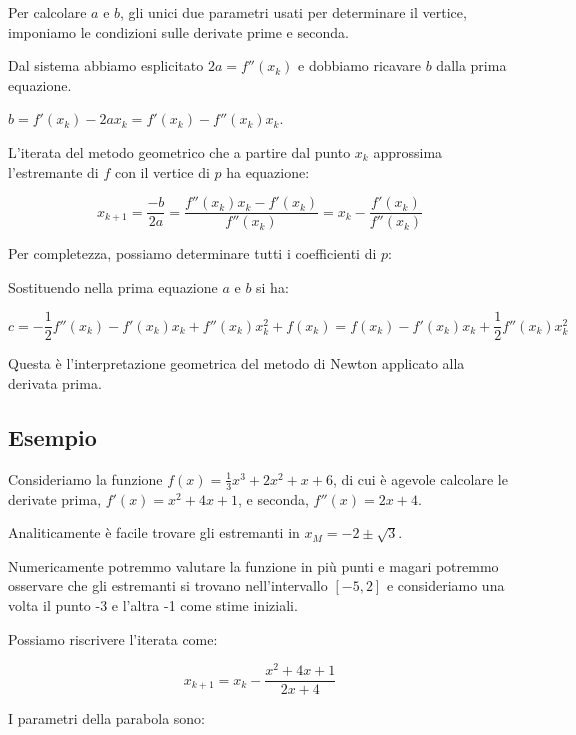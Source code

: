 Per calcolare $a$ e $b$, gli unici due parametri usati per determinare il vertice, imponiamo le condizioni sulle
derivate prime e seconda.


Dal sistema abbiamo esplicitato $2a = f''(x_k)$ e dobbiamo ricavare $b$ dalla prima equazione.

$b = f'(x_k) - 2a x_k = f'(x_k) - f''(x_k) x_k$.

L'iterata del metodo geometrico che a partire dal punto $x_k$ approssima l'estremante di $f$
con il vertice di $p$ ha equazione:

$$x_{k+1} = \frac{-b}{2a} = \frac{f''(x_k) x_k - f'(x_k)}{f''(x_k)} = x_k - \frac{f'(x_k)}{f''(x_k)}$$

Per completezza, possiamo determinare tutti i coefficienti di $p$:


Sostituendo nella prima equazione $a$ e $b$ si ha:

$$c = - \frac{1}{2} f''(x_k) - f'(x_k) x_k + f''(x_k) x_k^2 + f(x_k) = f(x_k)  - f'(x_k) x_k + \frac{1}{2} f''(x_k) x_k^2$$


Questa è l'interpretazione geometrica del metodo di Newton applicato alla derivata prima.

\subsection{Esempio}

Consideriamo la funzione $f(x) = \frac{1}{3} x^3 + 2 x^2 + x + 6$, di cui è agevole
calcolare le derivate prima, $f'(x) = x^2 + 4 x + 1$, e seconda, $f''(x) = 2x + 4$.

Analiticamente è facile trovare gli estremanti in $x_M = -2 \pm \sqrt{3}$.

Numericamente potremmo valutare la funzione in più punti e magari potremmo osservare
che gli estremanti si trovano nell'intervallo $[-5, 2]$ e consideriamo una volta il
punto -3 e l'altra -1 come stime iniziali.

Possiamo riscrivere l'iterata come:

$$x_{k+1} = x_k - \frac{x^2 + 4 x + 1}{2x + 4}$$

I parametri della parabola sono:


